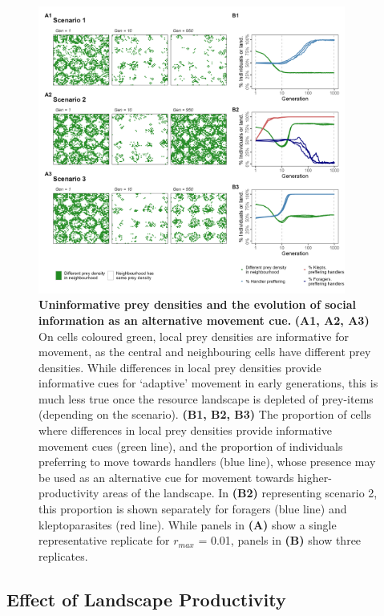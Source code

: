 \begin{refsection}[sorting=nyt]
\begin{figure}[t!]
    \centering
    \includegraphics[width=0.9\textwidth]{figures/kleptomove/fig_05.png}
    \caption{
        \textbf{Uninformative prey densities and the evolution of social information as an alternative movement cue.}
        \textbf{(A1, A2, A3)} On cells coloured green, local prey densities are informative for movement, as the central and neighbouring cells have different prey densities.
        While differences in local prey densities provide informative cues for `adaptive' movement in early generations, this is much less true once the resource landscape is depleted of prey-items (depending on the scenario).
        \textbf{(B1, B2, B3)} The proportion of cells where differences in local prey densities provide informative movement cues (green line), and the proportion of individuals preferring to move towards handlers (blue line), whose presence may be used as an alternative cue for movement towards higher-productivity areas of the landscape.
        In \textbf{(B2)} representing scenario 2, this proportion is shown separately for foragers (blue line) and kleptoparasites (red line).
        While panels in \textbf{(A)} show a single representative replicate for $r_{max}$ = 0.01, panels in \textbf{(B)} show three replicates.
    }
    \label{fig5}
\end{figure}

\subsection*{Effect of Landscape Productivity}


\end{refsection}
